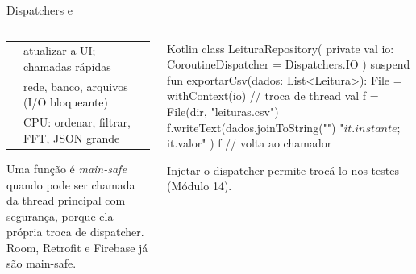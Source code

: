 \documentclass[aspectratio=169,10pt]{beamer}
\begin{document}
\begin{frame}[fragile]{Dispatchers e }
  \begin{columns}[T]
    \begin{column}{0.5\textwidth}
      \footnotesize
      \begin{tabularx}{\linewidth}{@{}l L@{}}
        \toprule
         &  \\
        \midrule
         & atualizar a UI; chamadas rápidas \\
         & rede, banco, arquivos (I/O bloqueante) \\
         & CPU: ordenar, filtrar, FFT, JSON grande \\
        \bottomrule
      \end{tabularx}
      \vspace{3pt}
      \begin{conceito}
        Uma função é \emph{main-safe} quando pode ser chamada da thread principal com segurança, porque ela própria troca de dispatcher. Room, Retrofit e Firebase já são main-safe.
      \end{conceito}
    \end{column}
    \begin{column}{0.48\textwidth}
\begin{codigo}[title=Repositório main-safe]{Kotlin}
class LeituraRepository(
  private val io: CoroutineDispatcher = Dispatchers.IO
) {
  suspend fun exportarCsv(dados: List<Leitura>): File =
    withContext(io) {               // troca de thread
      val f = File(dir, "leituras.csv")
      f.writeText(dados.joinToString("\n") {
        "${it.instante};${it.valor}"
      })
      f
    }                               // volta ao chamador
}
\end{codigo}
      \begin{dica}
        Injetar o dispatcher permite trocá-lo nos testes (Módulo 14).
      \end{dica}
    \end{column}
  \end{columns}
\end{frame}
\end{document}
